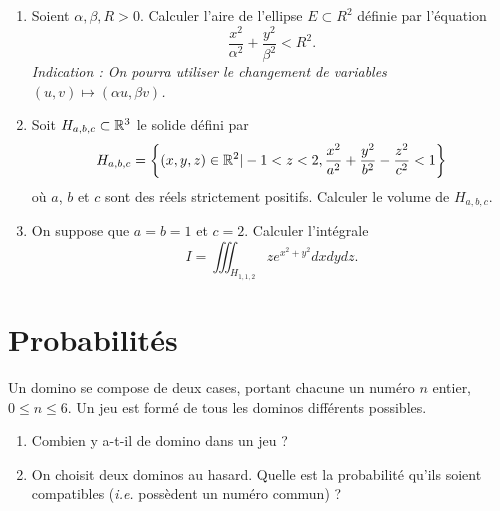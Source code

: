 \documentclass{article}
\begin{document}
\bigskip 

\exo{}
\begin{enumerate}
	\item Soient $\alpha, \beta, R > 0$. Calculer l'aire de l'ellipse $E \subset R^2$ définie par l'équation
		\[
			\frac{x^2}{\alpha^2} + \frac{y^2}{\beta^2} < R^2.
		\]
		{\it Indication : On pourra utiliser le changement de variables $(u,v) \mapsto (\alpha u, \beta v)$.}
	\item Soit $H_{a,b,c} \subset \mathbb{R}^3$ le solide défini par
\[
	H_{a,b,c} = \left\{  (x,y,z) \in \mathbb{R}^2 | -1 < z <2, \frac{x^2}{a^2} + \frac{y^2}{b^2} - \frac{z^2}{c^2} <1 \right\}
\]
		où $a$, $b$ et $c$ sont des réels strictement positifs. Calculer le volume de $H_{a,b,c}$.

	\item On suppose que $a = b = 1$ et $c = 2$. Calculer l'intégrale
		\[
			I = \iiint_{H_{1,1,2}} z e^{x^2+y^2}dxdydz.
		\]
\end{enumerate}

\bigskip


\section{Probabilités}

 Un domino se compose de deux cases, portant chacune un numéro $n$ entier, $0\leq n \leq 6$. Un jeu est formé de tous les dominos différents possibles. 
\begin{enumerate}
	\item Combien y a-t-il de domino dans un jeu ?
	\item On choisit deux dominos au hasard. Quelle est la probabilité qu'ils soient compatibles (\textit{i.e.} possèdent un numéro commun) ?
\end{enumerate}

\bigskip
\end{document}
